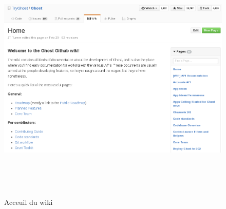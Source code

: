         \newpage
        \begin{figure}[h]
            \centering
            \includegraphics[height=12cm]{./assets/ghost3.png}
            \caption{Acceuil du wiki}
        \end{figure}
